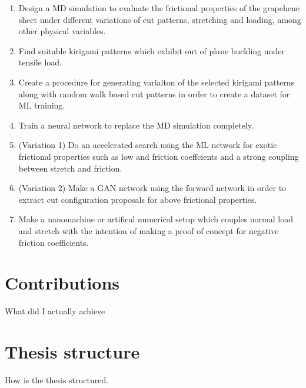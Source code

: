 \begin{enumerate}
    \item Design a MD simulation to evaluate the frictional properties of the
    grapehene sheet under different variations of cut patterns, stretching and
    loading, among other physical variables.
    \item Find suitable kirigami patterns which exhibit out of plane buckling under tensile load.
    \item Create a procedure for generating variaiton of the selected kirigami patterns along with random walk based cut patterns in order to create a dataset for ML training. 
    \item Train a neural network to replace the MD simulation completely.
    \item (Variation 1) Do an accelerated search using the ML network for exotic
    frictional properties such as low and friction coeffcients and a strong
    coupling between stretch and friction. 
    \item (Variation 2) Make a GAN network using the forward network in order to extract cut configuration proposals for above frictional properties.
    \item Make a nanomachine or artifical numerical setup which couples normal load and stretch with the intention of making a proof of concept for negative friction coefficients. 
\end{enumerate}


\section{Contributions}

What did I actually achieve

\section{Thesis structure}

How is the thesis structured.







